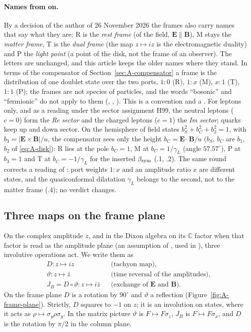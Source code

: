 \paragraph{Names from  on.}
By a decision of the author of 26 November 2026 the frames also carry names that say what they are: R is the \emph{rest frame}
(of the field, $\mathbf E\parallel\mathbf B$), M stays the \emph{matter frame}, T is the \emph{dual frame} (the map $z\mapsto iz$ is the
electromagnetic duality) and P the \emph{light point} (a point of the disk, not the frame of an observer). The letters are unchanged, and
this article keeps the older names where they stand. In terms of the compensator of Section~\ref{sec:A-compensator} a frame is the
distribution of one doublet state over the two ports, $1:0$ (R), $1:x$ (M), $x:1$ (T), $1:1$ (P); the frames are not species of particles,
and the words ``bosonic'' and ``fermionic'' do not apply to them (, , ). This is a convention and a \Reading{}.
For leptons only, and as a reading under the sector assignment H99, the neutral leptons ($c=0$) form the \emph{Re sector} and the charged
leptons ($c=1$) the \emph{Im sector}; quarks keep up and down sector. On the hemisphere of field states $b_S^2+b_C^2+b_3^2=1$, with
$b_3=|\mathbf E\times\mathbf B|/u$, the compensator sees only the height $b_C=\mathbf E\cdot\mathbf B/u$ ($b_S$, $b_C$ are $b_1$, $b_2$ of \eqref{eq:A-disk}): R lies at the pole $b_C=1$, M at
$b_C=1/\gamma_L$ (angle $57.57^\circ$), P at $b_3=1$ and T at $b_C=-1/\gamma_L$ \Established{} for the inserted $\beta_{\mathrm{sym}}$ (.1, .2).
The same round corrects a reading of : port weights $1:x$ and an amplitude ratio $x$ are different states, and the
quasiconformal dilatation $\gamma_L$ belongs to the second, not to the matter frame (.4); no verdict changes.

\subsection{Three maps on the frame plane}
\label{sec:A-maps}

On the complex amplitude $z$, and in the Dixon algebra on its $\mathbb C$ factor when that factor is read as the
amplitude plane (an assumption of , used in ), three involutive operations act. We write them as
\begin{equation}
\begin{aligned}
&D\colon z\mapsto iz &&\text{(tachyon map)},\\
&\vartheta\colon z\mapsto\bar z &&\text{(time reversal of the amplitudes)},\\
&J_B=D\circ\vartheta\colon z\mapsto i\bar z &&\text{(exchange of $\mathbf E$ and $\mathbf B$)}.
\end{aligned}
\label{eq:A-maps}
\end{equation}
On the frame plane $D$ is a rotation by $90^\circ$ and $\vartheta$ a reflection
(Figure~\ref{fig:A-frame-plane}). Strictly, $D$ squares to $-1$ on $z$; it is an involution on states,
where it acts as $\rho\mapsto\sigma_y\rho\sigma_y$. In the matrix picture $\vartheta$ is $F\mapsto F\sigma_z$,
$J_B$ is $F\mapsto F\sigma_x$, and $D$ is the rotation by $\pi/2$ in the column plane.

